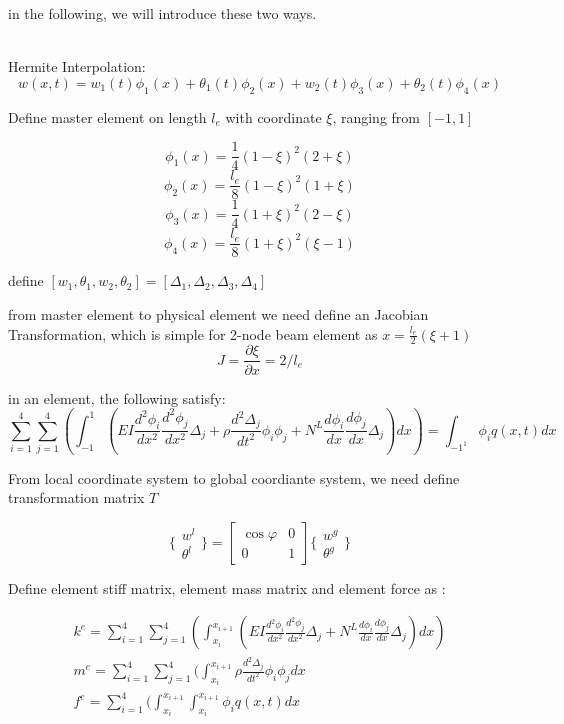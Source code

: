 \documentclass[11pt]{article}
\begin{document}
\begin{enumerate}
in the following, we will introduce these two ways.

 \\

Hermite Interpolation:
$$ w(x,t) = w_1(t) \phi_1(x) + \theta_1(t) \phi_2(x) + w_2(t) \phi_3(x) + \theta_2(t) \phi_4(x) $$

Define master element on length $l_e$ with coordinate $\xi$, ranging from $[-1, 1]$

$$ \phi_1(x) = \frac{1}{4} (1-\xi)^2 (2+\xi) $$
$$ \phi_2(x) = \frac{l_e}{8}(1-\xi)^2(1+\xi) $$
$$ \phi_3(x) = \frac{1}{4} (1+\xi)^2 (2-\xi) $$
$$ \phi_4(x) = \frac{l_e}{8}(1+\xi)^2(\xi-1) $$

define $[w_1, \theta_1, w_2, \theta_2] = [ \Delta_1, \Delta_2,\Delta_3, \Delta_4] $

from master element to physical element we need define an Jacobian Transformation, which is simple for 2-node  beam element  as $ x = \frac{l_e}{2} (\xi + 1)$
$$ J = \frac{\partial \xi}{\partial x} = 2/l_e $$


in an element, the following satisfy:
$$ \sum_{i=1}^4 \sum_{j=1}^4 ( \int_{-1}^{1}( EI \frac{d^2 \phi_i}{dx^2} \frac{d^2 \phi_j}{dx^2}\Delta_j + \rho \frac{d^2 \Delta_j}{dt^2} \phi_i \phi_j + N^L \frac{d \phi_i}{dx} \frac{d \phi_j}{dx} \Delta_j) dx) = \int_{-1^{1}} \phi_i q(x,t) dx $$  

From local coordinate system to global coordiante system, we need define transformation matrix $T$

$$
\{ \begin{array}{c} w^l \\ \theta^l \end{array} \} = \begin{bmatrix} \cos \varphi & 0 \\ 0 & 1 \end{bmatrix} \{ \begin{array}{c} w^g \\ \theta^g \end{array} \}
$$

Define element stiff matrix, element mass matrix and element force as :

\begin{subequations}
\begin{align}
k^e = \sum_{i=1}^4 \sum_{j=1}^4 ( \int_{x_i}^{x_{i+1}}( EI \frac{d^2 \phi_i}{dx^2} \frac{d^2 \phi_j}{dx^2}\Delta_j + N^L \frac{d \phi_i}{dx} \frac{d \phi_j}{dx} \Delta_j) dx) \\
m^e =  \sum_{i=1}^4 \sum_{j=1}^4 ( \int_{x_i}^{x_{i+1}} \rho \frac{d^2 \Delta_j}{dt^2} \phi_i \phi_j dx \\
f^e =  \sum_{i=1}^4 ( \int_{x_i}^{x_{i+1}} \int_{x_i}^{x_{i+1}} \phi_i q(x,t) dx
\end{align}
\end{subequations}


\end{enumerate}
\end{document}
